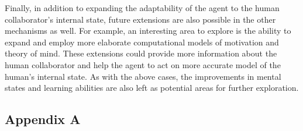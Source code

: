 \documentclass[12pt]{report}
\begin{document}
Finally, in addition to expanding the adaptability of the agent to the human
collaborator's internal state, future extensions are also possible in the other
mechanisms as well. For example, an interesting area to explore is the ability
to expand and employ more elaborate computational models of motivation and theory
of mind. These extensions could provide more information about the human
collaborator and help the agent to act on more accurate model of the human's
internal state. As with the above cases, the improvements in mental states and
learning abilities are also left as potential areas for further exploration.

\pagebreak





\begin{appendices}
\chapter*{Appendix A}
\label{apdx:constraints}

\end{appendices}
\end{document}
